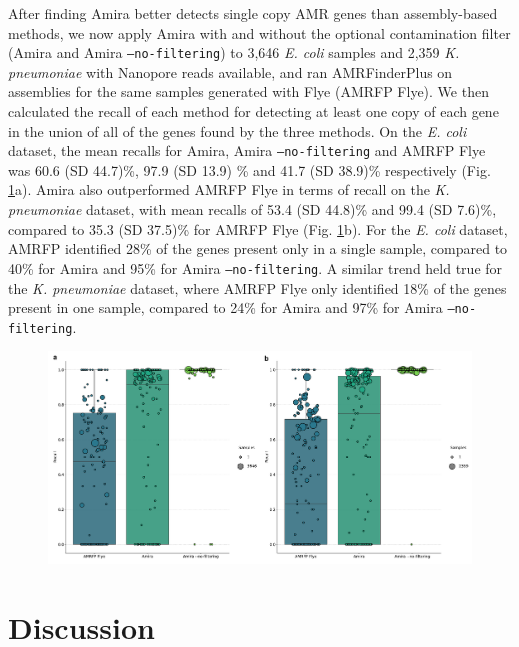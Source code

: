 After finding Amira better detects single copy AMR genes than assembly-based methods, we now apply Amira with and without the optional contamination filter (Amira and Amira \texttt{–no-filtering}) to 3,646 \textit{E. coli} samples and 2,359 \textit{K. pneumoniae} with Nanopore reads available, and ran AMRFinderPlus on assemblies for the same samples generated with Flye (AMRFP Flye). We then calculated the recall of each method for detecting at least one copy of each gene in the union of all of the genes found by the three methods. On the \textit{E. coli} dataset, the mean recalls for Amira, Amira \texttt{–no-filtering} and AMRFP Flye was 60.6 (SD 44.7)\%, 97.9 (SD 13.9) \% and 41.7 (SD 38.9)\% respectively (Fig. \ref{fig:5}a). Amira also outperformed AMRFP Flye in terms of recall on the \textit{K. pneumoniae} dataset, with mean recalls of 53.4 (SD 44.8)\% and 99.4 (SD 7.6)\%, compared to 35.3 (SD 37.5)\% for AMRFP Flye (Fig. \ref{fig:5}b). For the \textit{E. coli} dataset, AMRFP identified 28\% of the genes present only in a single sample, compared to 40\% for Amira and 95\% for Amira \texttt{–no-filtering}. A similar trend held true for the \textit{K. pneumoniae} dataset, where AMRFP Flye only identified 18\% of the genes present in one sample, compared to 24\% for Amira and 97\% for Amira \texttt{–no-filtering}.

\begin{figure}
\centering
\includegraphics[width=1\linewidth]{Figures/figure_5.pdf}
\caption{}
\label{fig:5}
\end{figure}

\section*{Discussion}

